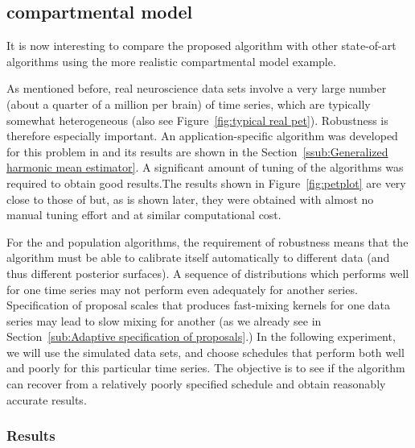 \subsection{\protect\pet compartmental model}
\label{sub:pet compartmental model}

It is now interesting to compare the proposed algorithm with other state-of-art algorithms using the more realistic \pet compartmental model example.

As mentioned before, real neuroscience data sets involve a very large number (about a quarter of a million per brain) of time series, which are typically somewhat heterogeneous (also see Figure~\ref{fig:typical real pet}). Robustness is therefore especially important. An application-specific \mcmc algorithm was developed for this problem in \cite{Zhou2013} and its results are shown in the Section~\ref{ssub:Generalized harmonic mean estimator}. A significant amount of tuning of the algorithms was required to obtain good results.The results shown in Figure~\ref{fig:petplot} are very close to those of \cite{Zhou2013} but, as is shown later, they were obtained with almost no manual tuning effort and at similar computational cost.

For the \smc and population \mcmc algorithms, the requirement of robustness means that the algorithm must be able to calibrate itself automatically to different data (and thus different posterior surfaces). A sequence of distributions which performs well for one time series may not perform even adequately for another series. Specification of proposal scales that produces fast-mixing kernels for one data series may lead to slow mixing for another (as we already see in Section~\ref{sub:Adaptive specification of proposals}.) In the following experiment, we will use the simulated data sets, and choose schedules that perform both well and poorly for this particular time series. The objective is to see if the algorithm can recover from a relatively poorly specified schedule and obtain reasonably accurate results.

\subsubsection{Results}

